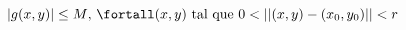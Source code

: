 \documentclass{article}
\begin{document}
$$
|g(x,y)| \leq M\text{, } \fortall (x,y) \text{ tal que } 0 < ||(x,y) - (x_0,y_0)|| < r
$$
\end{document}

